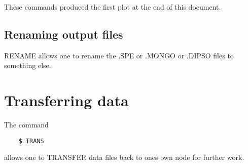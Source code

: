 These commands produced the first plot at the end of this document.

\subsection{Renaming output files}
RENAME allows one to rename the .SPE or .MONGO or .DIPSO files to
something else.

\section{Transferring data}

The command
\begin{verbatim}
    $ TRANS
\end{verbatim}
allows one to TRANSFER data files back to ones own node for further work.

